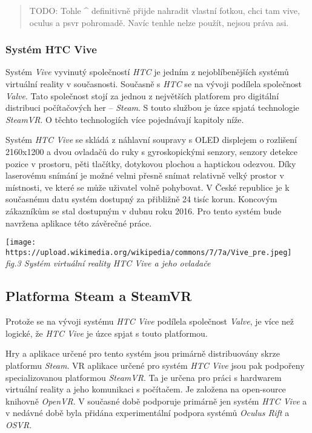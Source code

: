 \begin{quote}
TODO: Tohle \^{} definitivně přijde nahradit vlastní fotkou, chci tam
vive, oculus a psvr pohromadě. Navíc tenhle nelze použít, nejsou práva
asi.
\end{quote}

\subsubsection{Systém HTC Vive}\label{systuxe9m-htc-vive}

Systém \emph{Vive} vyvinutý společností \emph{HTC} je jedním z
nejoblíbenějších systémů virtuální reality v současnosti. Současně s
\emph{HTC} se na vývoji podílela společnost \emph{Valve}. Tato
společnost stojí za jednou z největších platforem pro digitální
distribuci počítačových her -- \emph{Steam}. S touto službou je úzce
spjatá technologie \emph{SteamVR}. O těchto technologiích více
pojednávají kapitoly níže.

Systém \emph{HTC Vive} se skládá z náhlavní soupravy s OLED displejem o
rozlišení 2160x1200 a dvou ovladačů do ruky s gyroskopickými senzory,
senzory detekce pozice v prostoru, pěti tlačítky, dotykovou plochou a
haptickou odezvou. Díky laserovému snímání je možné velmi přesně snímat
relativně velký prostor v místnosti, ve které se může uživatel volně
pohybovat. V České republice je k současnému datu systém dostupný za
přibližně 24 tisíc korun. Koncovým zákazníkům se stal dostupným v dubnu
roku 2016. Pro tento systém bude navržena aplikace této závěrečné práce.

\texttt{[image: https://upload.wikimedia.org/wikipedia/commons/7/7a/Vive\_pre.jpeg]}\\
\emph{fig.3 Systém virtuální reality HTC Vive a jeho ovladače}

\subsection{Platforma Steam a SteamVR}\label{platforma-steam-a-steamvr}

Protože se na vývoji systému \emph{HTC Vive} podílela společnost
\emph{Valve}, je více než logické, že \emph{HTC Vive} je úzce spjat s
touto platformou.

Hry a aplikace určené pro tento systém jsou primárně distribuovány skrze
platformu \emph{Steam}. VR aplikace určené pro systém \emph{HTC Vive}
jsou pak podpořeny specializovanou platformou \emph{SteamVR}. Ta je
určena pro práci s hardwarem virtuální reality a jeho komunikaci s
počítačem. Je založena na open-source knihovně \emph{OpenVR}. V současné
době podporuje primárně jen systém \emph{HTC Vive} a v nedávné době byla
přidána experimentální podpora systémů \emph{Oculus Rift} a \emph{OSVR}.

